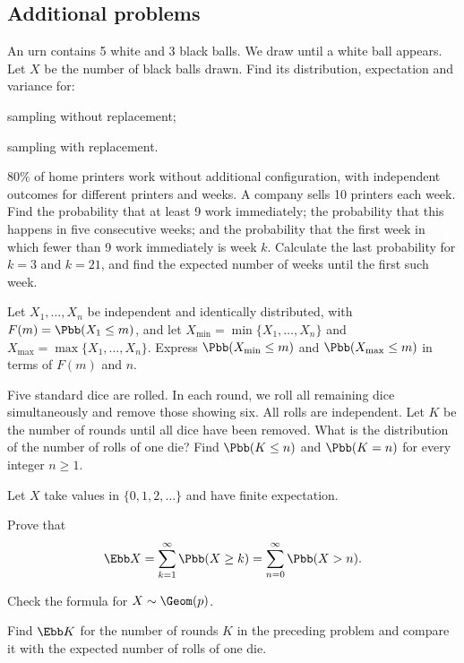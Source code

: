 \subsection*{Additional problems}
\begin{problem}
An urn contains 5 white and 3 black balls. We draw until a white ball appears.
Let $X$ be the number of black balls drawn. Find its distribution, expectation and variance for:
\begin{enumeratea}
  \item sampling without replacement;
  \item sampling with replacement.
\end{enumeratea}
\end{problem}
\begin{problem}
$80\%$ of home printers work without additional configuration, with independent
outcomes for different printers and weeks. A company sells 10 printers each week.
Find the probability that at least 9 work immediately; the probability that this
happens in five consecutive weeks; and the probability that the first week in
which fewer than 9 work immediately is week $k$. Calculate the last probability
for $k=3$ and $k=21$, and find the expected number of weeks until the first such week.
\end{problem}
\begin{problempencil}[Test 1, SE 2023]
\begin{enumeratea}
  \item Let $X_1,\dots,X_n$ be independent and identically distributed, with
  $F(m)=\Pbb(X_1\le m)$, and let $X_{\min}=\min\{X_1,\dots,X_n\}$ and
  $X_{\max}=\max\{X_1,\dots,X_n\}$. Express $\Pbb(X_{\min}\le m)$ and
  $\Pbb(X_{\max}\le m)$ in terms of $F(m)$ and $n$.
  \item Five standard dice are rolled. In each round, we roll all remaining dice
  simultaneously and remove those showing six. All rolls are independent. Let $K$
  be the number of rounds until all dice have been removed. What is the distribution
  of the number of rolls of one die? Find $\Pbb(K\le n)$ and $\Pbb(K=n)$ for every integer $n\ge1$.
\end{enumeratea}
\end{problempencil}
\begin{problem}
Let $X$ take values in $\{0,1,2,\dots\}$ and have finite expectation.
\begin{enumeratea}
  \item Prove that
  \[ \Ebb X=\sum_{k=1}^\infty\Pbb(X\ge k)=\sum_{n=0}^\infty\Pbb(X>n). \]
  \item Check the formula for $X\sim\Geom(p)$.
  \item Find $\Ebb K$ for the number of rounds $K$ in the preceding problem and
  compare it with the expected number of rolls of one die.
\end{enumeratea}
\end{problem}

